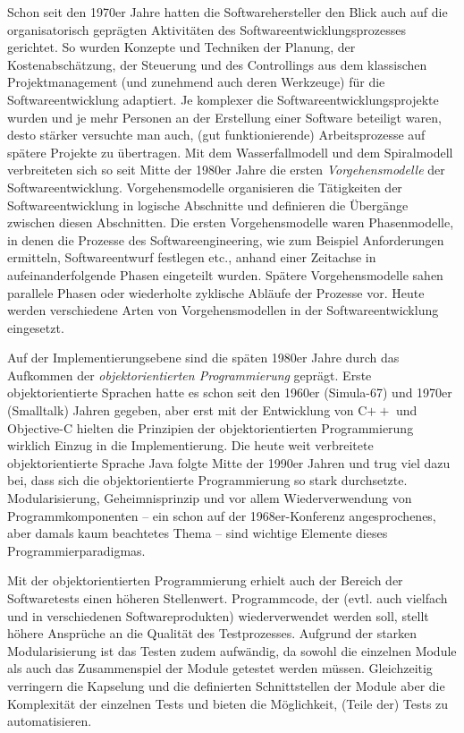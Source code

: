 Schon seit den 1970er Jahre hatten die Softwarehersteller den Blick auch auf die organisatorisch geprägten Aktivitäten des Softwareentwicklungsprozesses gerichtet. So wurden Konzepte und Techniken der Planung, der Kostenabschätzung, der Steuerung und des Controllings aus dem klassischen Projektmanagement (und zunehmend auch deren Werkzeuge) für die Softwareentwicklung adaptiert. Je komplexer die Softwareentwicklungsprojekte wurden und je mehr Personen an der Erstellung einer Software beteiligt waren, desto stärker versuchte man auch, (gut funktionierende) Arbeitsprozesse auf spätere Projekte zu übertragen. Mit dem Wasserfallmodell und dem Spiralmodell verbreiteten sich so seit Mitte der 1980er Jahre die ersten 
\textit{Vor\-gehens\-modelle} der Softwareentwicklung. Vorgehensmodelle organisieren die Tätigkeiten der Softwareentwicklung in logische Abschnitte und definieren die Übergänge zwischen diesen Abschnitten. Die ersten Vorgehensmodelle waren Phasenmodelle, in denen die Prozesse des Softwareengineering, wie zum Beispiel Anforderungen ermitteln, Softwareentwurf festlegen etc., anhand einer Zeitachse in aufeinanderfolgende Phasen eingeteilt wurden. Spätere Vorgehensmodelle sahen parallele Phasen oder wiederholte zyklische Abläufe der Prozesse vor. Heute werden verschiedene Arten von Vorgehensmodellen in der Softwareentwicklung eingesetzt. 


Auf der Implementierungsebene sind die späten 1980er Jahre durch das Aufkommen der \textit{objektorientierten Programmierung} geprägt. 
Erste objektorientierte Sprachen hatte es schon seit den 1960er (Simula-67) und 1970er (Smalltalk) Jahren gegeben, aber erst mit der Entwicklung von C$++$ und Objective-C hielten die Prinzipien der objektorientierten Programmierung wirklich Einzug in die Implementierung. Die heute weit verbreitete objektorientierte Sprache Java folgte Mitte der 1990er Jahren und trug viel dazu bei, dass sich die objektorientierte Programmierung so stark durchsetzte. Modularisierung, Geheimnisprinzip und vor allem Wiederverwendung von Programmkomponenten – ein schon auf der 1968er-Konferenz angesprochenes, aber damals kaum beachtetes Thema – sind wichtige Elemente dieses Programmierparadigmas. 

Mit der objektorientierten Programmierung erhielt auch der Bereich der Softwaretests 
einen höheren Stellenwert. Programmcode, der (evtl. auch vielfach und in verschiedenen Softwareprodukten) wiederverwendet werden soll, stellt höhere Ansprüche an die Qualität des Testprozesses. Aufgrund der starken Modularisierung ist das Testen zudem aufwändig, da sowohl die einzelnen Module als auch das Zusammenspiel der Module getestet werden müssen. Gleichzeitig verringern die Kapselung 
und die definierten Schnittstellen der Module aber die Komplexität der einzelnen Tests und bieten die Möglichkeit, (Teile der) Tests zu automatisieren. 

